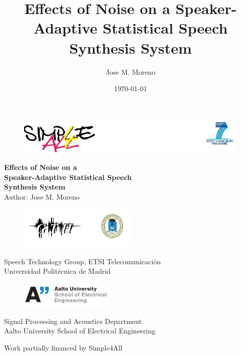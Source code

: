 \documentclass[12pt,a4paper]{article}
\title{Effects of Noise on a Speaker-Adaptive Statistical Speech Synthesis System}
\author{Jose M. Moreno}
\date{\today}
\begin{document}
\begin{titlepage}
\begin{figure} [htb]
	\begin{center}
	\includegraphics[width=1\textwidth]{img/portada1.jpg}
	\end{center}
\end{figure}
\vspace{1.5cm}
\begin{center}
	\textbf{{\LARGE Effects of Noise on a\\
	 Speaker-Adaptive Statistical Speech\\
	  Synthesis System}}\\
	\vspace{1cm}
	{\large Author: Jose M. Moreno}
\end{center}
\begin{figure} [htb]
	\begin{center}
	\includegraphics[width=0.5\textwidth]{img/portada2.jpg}
	\end{center}
\end{figure}
\vspace{-1cm}
\begin{center}
	{Speech Technology Group, ETSI Telecomunicaci\'on\\
	Universidad Polit\'ecnica de Madrid}
	\end{center}
\begin{figure} [htb]
	\begin{center}
	\includegraphics[width=0.4\textwidth]{img/portada3.jpg}
	\end{center}
\end{figure}
\vspace{-1cm}
\begin{center}
	{Signal Processing and Acoustics Department\\
	Aalto University School of Electrical Engineering}
	\end{center}
\begin{center}
	{Work partially financed by Simple4All}
	\end{center}
\end{titlepage}
\end{document}
